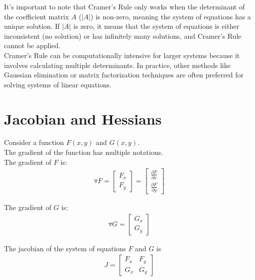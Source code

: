 \documentclass{article}
\begin{document}
It's important to note that Cramer's Rule only works when the determinant of the coefficient matrix $A$ ($|A|$) is non-zero, meaning the system of equations has a unique solution. If $|A|$ is zero, it means that the system of equations is either inconsistent (no solution) or has infinitely many solutions, and Cramer's Rule cannot be applied.\\

Cramer's Rule can be computationally intensive for larger systems because it involves calculating multiple determinants. In practice, other methods like Gaussian elimination or matrix factorization techniques are often preferred for solving systems of linear equations.\\

\section{Jacobian and Hessians}

Consider a function $F(x,y)$ and $G(x,y)$. \\

The gradient of the function has multiple notations. \\

The gradient of $F$ is: 
\begin{align}
    \triangledown F = \begin{bmatrix}
        F_x \\
        F_y
    \end{bmatrix}
    = \begin{bmatrix}
        \frac{\partial F}{\partial x}\\
        \frac{\partial F}{\partial y}
    \end{bmatrix}
\end{align}

The gradient of $G$ is: 
\begin{align}
    \triangledown G = \begin{bmatrix}
        G_x \\
        G_y
    \end{bmatrix}
\end{align}

The jacobian of the system of equations $F$ and $G$ is 
\begin{align}
    J = \begin{bmatrix}
        F_x & F_y\\
        G_x & G_y 
    \end{bmatrix}
\end{align}
\end{document}
